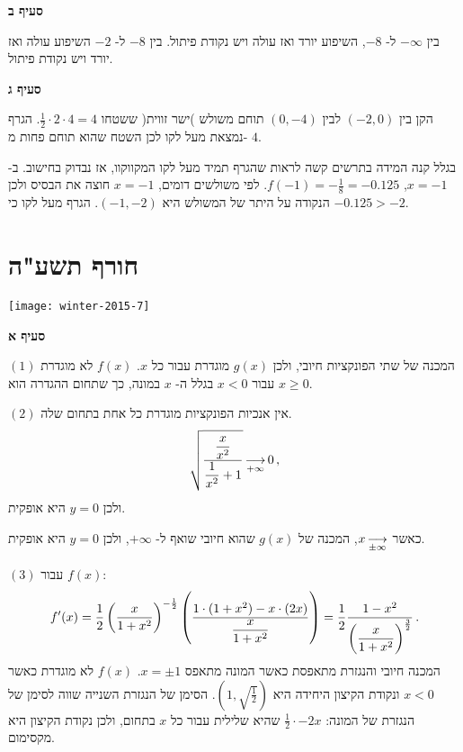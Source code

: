 \textbf{סעיף ב}

בין 
$-\infty$
ל-%
$-8$,
השיפוע יורד ואז עולה ויש נקודת פיתול. בין
$-8$
ל-%
$-2$
השיפוע עולה ואז יורד ויש נקודת פיתול.

\textbf{סעיף ג}

הקן בין 
$(-2,0)$
לבין
$(0,-4)$
תוחם משולש )ישר זווית( ששטחו
$\frac{1}{2}\cdot 2 \cdot 4=4$.
הגרף נמצאת מעל לקו לכן השטח שהוא תוחם פחות מ-%
$4$.

בגלל קנה המידה בתרשים קשה לראות שהגרף תמיד מעל לקו המקווקוו, אז נבדוק בחישוב. ב-%
$x=-1$,
$f(-1)=-\frac{1}{8}=-0.125$.
לפי משולשים דומים, 
$x=-1$
חוצה את הבסיס ולכן הנקודה על היתר של המשולש היא
$(-1,-2)$.
הגרף מעל לקו כי
$-0.125>-2$.



\np




\section{חורף תשע"ה}

\begin{center}
\texttt{[image: winter-2015-7]}
\end{center}

\vspace{-2ex}

\textbf{סעיף א}

$(1)$
המכנה של שתי הפונקציות חיובי, ולכן 
$g(x)$
מוגדרת עבור כל
$x$.
$f(x)$
לא מוגדרת עבור
$x<0$
בגלל ה-%
$x$
במונה, כך שתחום ההגדרה הוא
$x\geq 0$.

$(2)$
אין 
\asms{}
אנכיות הפונקציות מוגדרת כל אחת בתחום שלה.
\[
\sqrt{\frac{\displaystyle\frac{x}{x^2}}{\displaystyle\frac{1}{x^2}+1}}\mathop{\longrightarrow}\limits_{+\infty} 0\,,
\]
ולכן
$y=0$
היא
\asm{}
אופקית.

כאשר
$x\mathop{\longrightarrow}\limits_{\pm\infty}$,
המכנה של
$g(x)$
שהוא חיובי שואף ל-%
$+\infty$,
ולכן
$y=0$
היא
\asm{}
אופקית.

$(3)$
עבור
$f(x)$:
\[
f'(x)= \frac{1}{2} \left(\frac{x}{1+x^2}\right)^{-\frac{1}{2}}\left(\frac{1\cdot(1+x^2)-x\cdot (2x)}{\displaystyle\frac{x}{1+x^2}}\right)=\frac{1}{2} \frac{1-x^2}{\left(\displaystyle\frac{x}{1+x^2}\right)^{\frac{3}{2}}}\,.
\]
המכנה חיובי והנגזרת מתאפסת כאשר המונה מתאפס
$x=\pm 1$.
$f(x)$
לא מוגדרת כאשר 
$x<0$
ונקודת הקיצון היחידה היא
$\left(1,\sqrt{\frac{1}{2}}\right)$.
הסימן של הנגזרת השנייה שווה לסימן של הנגזרת של המונה:
$\frac{1}{2}\cdot -2x$
שהיא שלילית עבור כל 
$x$
בתחום, ולכן נקודת הקיצון היא מקסימום.

